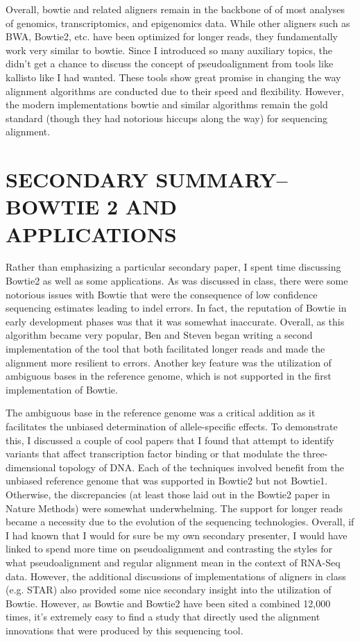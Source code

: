 \documentclass[12pt]{article}
\begin{document}
\begin{addmargin}[6.5mm]{4mm}
Overall, bowtie and related aligners remain in the backbone of of most analyses of genomics, transcriptomics, and epigenomics data. While other aligners such as BWA, Bowtie2, etc. have been optimized for longer reads, they fundamentally work very similar to bowtie. Since I introduced so many auxiliary topics, the didn't get a chance to discuss the concept of pseudoalignment from tools like kallisto like I had wanted. These tools show great promise in changing the way alignment algorithms are conducted due to their speed and flexibility. However, the modern implementations bowtie and similar algorithms remain the gold standard (though they had notorious hiccups along the way) for sequencing alignment.
\end{addmargin}

\section*{\textbf{{\Large S}{\small ECONDARY} {\Large S}{\small UMMARY}{\Large --B}{\small OWTIE 2 AND }{\Large A}{\small PPLICATIONS} }}
\begin{addmargin}[6.5mm]{4mm}
Rather than emphasizing a particular secondary paper, I spent time discussing Bowtie2 as well as some applications. As was discussed in class, there were some notorious issues with Bowtie that were the consequence of low confidence sequencing estimates leading to indel errors. In fact, the reputation of Bowtie in early development phases was that it was somewhat inaccurate. Overall, as this algorithm became very popular, Ben and Steven began writing a second implementation of the tool that both facilitated longer reads and made the alignment more resilient to errors. Another key feature was the utilization of ambiguous bases in the reference genome, which is not supported in the first implementation of Bowtie. \newline

The ambiguous base in the reference genome was a critical addition as it facilitates the unbiased determination of allele-specific effects. To demonstrate this, I discussed a couple of cool papers that I found that attempt to identify variants that affect transcription factor binding or that modulate the three-dimensional topology of DNA. Each of the techniques involved benefit from the unbiased reference genome that was supported in Bowtie2 but not Bowtie1. Otherwise, the discrepancies (at least those laid out in the Bowtie2 paper in Nature Methods) were somewhat underwhelming. The support for longer reads became a necessity due to the evolution of the sequencing technologies. Overall, if I had known that I would for sure be my own secondary presenter, I would have linked to spend more time on pseudoalignment and contrasting the styles for what pseudoalignment and regular alignment mean in the context of RNA-Seq data. However, the additional discussions of implementations of aligners in class (e.g. STAR) also provided some nice secondary insight into the utilization of Bowtie. However, as Bowtie and Bowtie2 have been sited a combined 12,000 times, it's extremely easy to find a study that directly used the alignment innovations that were produced by this sequencing tool. 
\end{addmargin}
\end{document}
